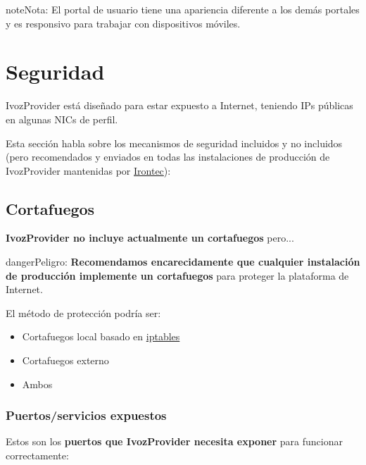 \documentclass[letterpaper,10pt,spanish]{sphinxmanual}
\begin{document}
\begin{notice}{note}{Nota:}
El portal de usuario tiene una apariencia diferente a los demás portales y es responsivo para trabajar con dispositivos móviles.
\end{notice}


\chapter{Seguridad}
\label{security_and_maintenance/security/index:security}\label{security_and_maintenance/security/index::doc}\label{security_and_maintenance/security/index:id1}
IvozProvider está diseñado para estar expuesto a Internet, teniendo IPs públicas en algunas NICs de perfil.

Esta sección habla sobre los mecanismos de seguridad incluidos y no incluidos (pero recomendados y enviados en todas las instalaciones de producción de IvozProvider mantenidas por \href{https://www.irontec.com}{Irontec}):


\section{Cortafuegos}
\label{security_and_maintenance/security/firewall:firewall}\label{security_and_maintenance/security/firewall::doc}
\textbf{IvozProvider no incluye actualmente un cortafuegos} pero...

\begin{notice}{danger}{Peligro:}
\textbf{Recomendamos encarecidamente que cualquier instalación de producción implemente un cortafuegos} para proteger la plataforma de Internet.
\end{notice}

El método de protección podría ser:
\begin{itemize}
\item {} 
Cortafuegos local basado en \href{https://www.netfilter.org/}{iptables}

\item {} 
Cortafuegos externo

\item {} 
Ambos

\end{itemize}


\subsection{Puertos/servicios expuestos}
\label{security_and_maintenance/security/firewall:exposed-ports-services}
Estos son los \textbf{puertos que IvozProvider necesita exponer} para funcionar correctamente:
\end{document}
